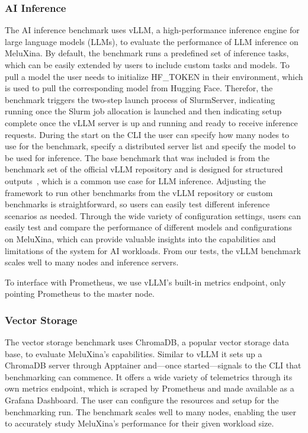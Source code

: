 \documentclass[conference,12pt]{IEEEtran}
\begin{document}
    \subsubsection{AI Inference}
    The AI inference benchmark uses vLLM, a high-performance inference engine for large language models (LLMs), to evaluate the performance of LLM inference on MeluXina.
    By default, the benchmark runs a predefined set of inference tasks, which can be easily extended by users to include custom tasks and models.
    To pull a model the user needs to initialize HF\_TOKEN in their environment, which is used to pull the corresponding model from Hugging Face.
    Therefor, the benchmark triggers the two-step launch process of SlurmServer, indicating running once the Slurm job allocation is launched and then indicating setup complete once the vLLM server is up and running and ready to receive inference requests.
    During the start on the CLI the user can specify how many nodes to use for the benchmark, specify a distributed server list and specify the model to be used for inference. The base benchmark that was included is from the benchmark set of the official vLLM repository and is designed for structured outputs~\cite{Structured}, which is a common use case for LLM inference. Adjusting the framework to run other benchmarks from the vLLM repository or custom benchmarks is straightforward, so users can easily test different inference scenarios as needed.
    Through the wide variety of configuration settings, users can easily test and compare the performance of different models and configurations on MeluXina, which can provide valuable insights into the capabilities and limitations of the system for AI workloads. 
    From our tests, the vLLM benchmark scales well to many nodes and inference servers.
    
    To interface with Prometheus, we use vLLM's built-in metrics endpoint, only pointing Prometheus to the master node.

    \subsubsection{Vector Storage}
    The vector storage benchmark uses ChromaDB, a popular vector storage data base, to evaluate MeluXina's capabilities.
    Similar to vLLM it sets up a ChromaDB server through Apptainer and---once started---signals to the CLI that benchmarking can commence.
    It offers a wide variety of telemetrics through its own metrics endpoint, which is scraped by Prometheus and made available as a Grafana Dashboard.
    The user can configure the resources and setup for the benchmarking run.
    The benchmark scales well to many nodes, enabling the user to accurately study MeluXina's performance for their given workload size.
\end{document}
